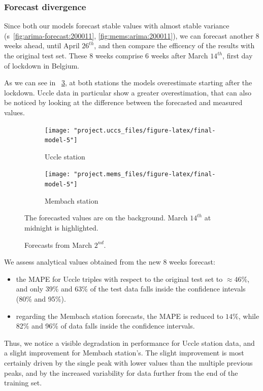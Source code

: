 \documentclass[12pt]{article}
\begin{document}
\subsubsection{Forecast divergence}
Since both our models forecast stable values with almost stable variance (\figurename{s}~\ref{fig:arima-forecast:200011}, \ref{fig:mems:arima:200011}), we can forecast another 8 weeks ahead, until April $26^{th}$, and then compare the efficency of the results with the original test set. These 8 weeks comprise 6 weeks after March $14^{th}$, first day of lockdown in Belgium.

As we can see in \figurename~\ref{fig:forecast.lockdown}, at both stations the models overestimate starting after the lockdown. Uccle data in particular show a greater overestimation, that can also be noticed by looking at the difference between the forecasted and measured values.

\begin{figure}[h]
	\begin{subfigure}{.5\linewidth}
		\texttt{[image: "project.uccs\_files/figure-latex/final-model-5"]}
		\caption{Uccle station}
		\label{fig:forecast.lockdown:uccs}
	\end{subfigure}
	\begin{subfigure}{.5\linewidth}
		\texttt{[image: "project.mems\_files/figure-latex/final-model-5"]}
		\caption{Membach station}
		\label{fig:forecast.lockdown:mems}
	\end{subfigure}
	\caption{Forecasts from March $2^{nd}$.}{\centering\small The forecasted values are on the background. March $14^{th}$ at midnight is highlighted.\\}
	\label{fig:forecast.lockdown}
\end{figure}
%
We assess analytical values obtained from the new 8 weeks forecast:
\begin{itemize}[topsep=0.5em,itemsep=0em,partopsep=0.5em]
	\item the MAPE for Uccle triples with respect to the original test set to $\approx46\%$, and only 39\% and 63\% of the test data falls inside the confidence intevals (80\% and 95\%).
	\item regarding the Membach station forecasts, the MAPE is reduced to $14\%$, while 82\% and 96\% of data falls inside the confidence intervals.
\end{itemize}

Thus, we notice a visible degradation in performance for Uccle station data, and a slight improvement for Membach station's. The slight improvement is most certainly driven by the single peak with lower values than the multiple previous peaks, and by the increased variability for data further from the end of the training set.
\end{document}

